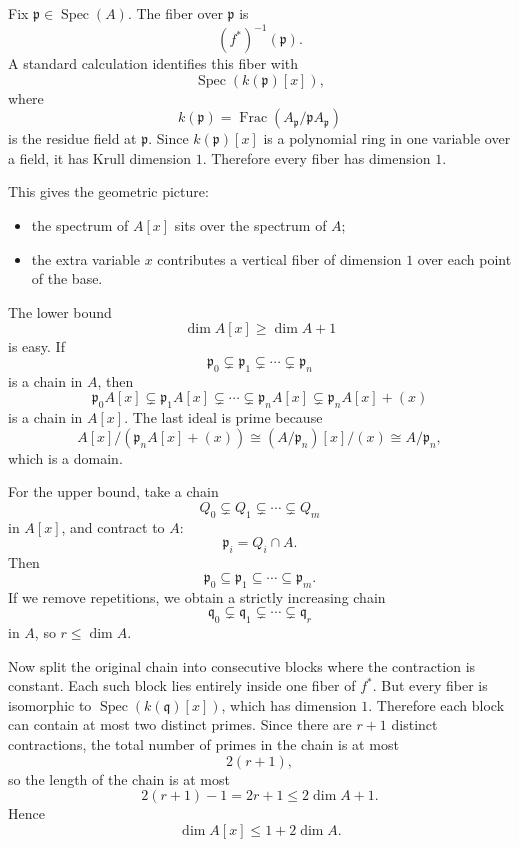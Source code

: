 \documentclass[12pt,a4paper]{article}
\theoremstyle{plain}
\theoremstyle{definition}      %
\begin{document}
\medskip

Fix \(\mathfrak p\in \operatorname{Spec}(A)\). The fiber over \(\mathfrak p\) is
\[
(f^*)^{-1}(\mathfrak p).
\]
A standard calculation identifies this fiber with
\[
\operatorname{Spec}(k(\mathfrak p)[x]),
\]
where
\[
k(\mathfrak p)=\operatorname{Frac}(A_{\mathfrak p}/\mathfrak p A_{\mathfrak p})
\]
is the residue field at \(\mathfrak p\). Since \(k(\mathfrak p)[x]\) is a polynomial ring in one variable over a field, it has Krull dimension \(1\). Therefore every fiber has dimension \(1\).

This gives the geometric picture:
\begin{itemize}
	\item the spectrum of \(A[x]\) sits over the spectrum of \(A\);
	\item the extra variable \(x\) contributes a vertical fiber of dimension \(1\) over each point of the base.
\end{itemize}

\medskip

The lower bound
\[
\dim A[x]\ge \dim A+1
\]
is easy. If
\[
\mathfrak p_0\subsetneq \mathfrak p_1\subsetneq \cdots \subsetneq \mathfrak p_n
\]
is a chain in \(A\), then
\[
\mathfrak p_0A[x]\subsetneq \mathfrak p_1A[x]\subsetneq \cdots \subsetneq \mathfrak p_nA[x]
\subsetneq
\mathfrak p_nA[x]+(x)
\]
is a chain in \(A[x]\). The last ideal is prime because
\[
A[x]/(\mathfrak p_nA[x]+(x))
\cong
(A/\mathfrak p_n)[x]/(x)
\cong
A/\mathfrak p_n,
\]
which is a domain.

\medskip

For the upper bound, take a chain
\[
Q_0\subsetneq Q_1\subsetneq \cdots \subsetneq Q_m
\]
in \(A[x]\), and contract to \(A\):
\[
\mathfrak p_i=Q_i\cap A.
\]
Then
\[
\mathfrak p_0\subseteq \mathfrak p_1\subseteq \cdots \subseteq \mathfrak p_m.
\]
If we remove repetitions, we obtain a strictly increasing chain
\[
\mathfrak q_0\subsetneq \mathfrak q_1\subsetneq \cdots \subsetneq \mathfrak q_r
\]
in \(A\), so \(r\le \dim A\).

Now split the original chain into consecutive blocks where the contraction is constant. Each such block lies entirely inside one fiber of \(f^*\). But every fiber is isomorphic to \(\operatorname{Spec}(k(\mathfrak q)[x])\), which has dimension \(1\). Therefore each block can contain at most two distinct primes. Since there are \(r+1\) distinct contractions, the total number of primes in the chain is at most
\[
2(r+1),
\]
so the length of the chain is at most
\[
2(r+1)-1=2r+1\le 2\dim A+1.
\]
Hence
\[
\dim A[x]\le 1+2\dim A.
\]
\end{document}
